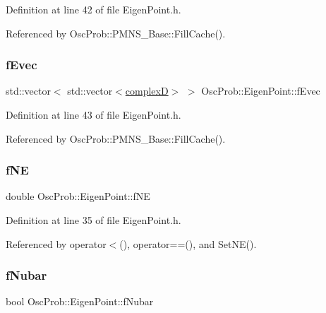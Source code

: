 Definition at line 42 of file Eigen\+Point.\+h.



Referenced by Osc\+Prob\+::\+P\+M\+N\+S\+\_\+\+Base\+::\+Fill\+Cache().

\mbox{\label{structOscProb_1_1EigenPoint_adf3ccb3d88ea1ae6ef3635fea8748e09}} 
\subsubsection{\texorpdfstring{f\+Evec}{fEvec}}
{\footnotesize\ttfamily std\+::vector$<$ std\+::vector$<$\hyperlink{EigenPoint_8h_a67ca8e107e20610c3fff78d5e726ece0}{complexD}$>$ $>$ Osc\+Prob\+::\+Eigen\+Point\+::f\+Evec}



Definition at line 43 of file Eigen\+Point.\+h.



Referenced by Osc\+Prob\+::\+P\+M\+N\+S\+\_\+\+Base\+::\+Fill\+Cache().

\mbox{\label{structOscProb_1_1EigenPoint_af985afcb8012deb6de4fcba66342e0d2}} 
\subsubsection{\texorpdfstring{f\+NE}{fNE}}
{\footnotesize\ttfamily double Osc\+Prob\+::\+Eigen\+Point\+::f\+NE}



Definition at line 35 of file Eigen\+Point.\+h.



Referenced by operator$<$(), operator==(), and Set\+N\+E().

\mbox{\label{structOscProb_1_1EigenPoint_a42655458f601a178afca216036e7b7d8}} 
\subsubsection{\texorpdfstring{f\+Nubar}{fNubar}}
{\footnotesize\ttfamily bool Osc\+Prob\+::\+Eigen\+Point\+::f\+Nubar}




